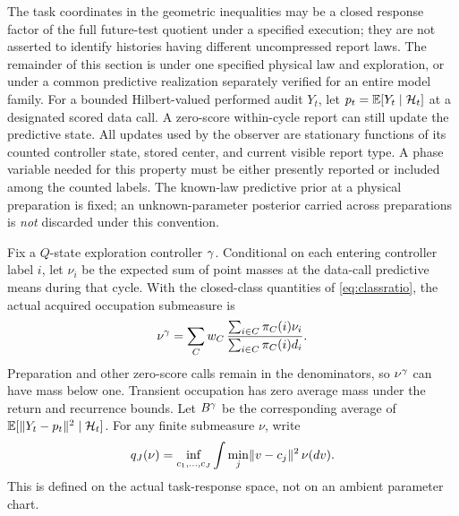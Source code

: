 The task coordinates in the geometric inequalities may be a closed response factor of the full future-test quotient under a specified execution; they are not asserted to identify histories having different uncompressed report laws. The remainder of this section is under one specified physical law and exploration, or under a common predictive realization separately verified for an entire model family. For a bounded Hilbert-valued performed audit $Y_t$, let $p_t=\mathbb E[Y_t\mid\mathcal H_t]$ at a designated scored data call. A zero-score within-cycle report can still update the predictive state. All updates used by the observer are stationary functions of its counted controller state, stored center, and current visible report type. A phase variable needed for this property must be either presently reported or included among the counted labels. The known-law predictive prior at a physical preparation is fixed; an unknown-parameter posterior carried across preparations is \emph{not} discarded under this convention.

Fix a $Q$-state exploration controller $\gamma$. Conditional on each entering controller label $i$, let $\nu_i$ be the expected sum of point masses at the data-call predictive means during that cycle. With the closed-class quantities of \eqref{eq:classratio}, the actual acquired occupation submeasure is
\begin{equation}\label{eq:occupation}
 \nu^\gamma=\sum_C w_C\,{\sum_{i\in C}\pi_C(i)\nu_i
                                  \over\sum_{i\in C}\pi_C(i)d_i}.
\end{equation}
Preparation and other zero-score calls remain in the denominators, so $\nu^\gamma$ can have mass below one. Transient occupation has zero average mass under the return and recurrence bounds. Let $B^\gamma$ be the corresponding average of $\mathbb E[\lVert Y_t-p_t\rVert^2\mid\mathcal H_t]$. For any finite submeasure $\nu$, write
\begin{equation}\label{eq:quant}
 q_J(\nu)=\inf_{c_1,\ldots,c_J}\int\min_j\lVert v-c_j\rVert^2\,\nu(dv).
\end{equation}
This is defined on the actual task-response space, not on an ambient parameter chart.

